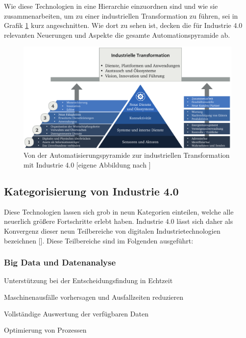 Wie diese Technologien in eine Hierarchie einzuordnen sind und wie sie zusammenarbeiten, um zu einer industriellen Transformation zu führen, sei in Grafik \ref{fig:Industrie40transformation} kurz angeschnitten. Wie dort zu sehen ist, decken die für Industrie 4.0 relevanten Neuerungen und Aspekte die gesamte Automationspyramide ab.
%
\begin{figure}[htbp]
	\centering\includegraphics[width=1.0\textwidth]{images/02/Industrie40transformation.pdf}
    \caption{Von der Automatisierungspyramide zur industriellen Transformation mit Industrie 4.0 [eigene Abbildung nach \cite{industrie40explained}]}
    \label{fig:Industrie40transformation}
\end{figure}

\subsection{Kategorisierung von Industrie 4.0}
\label{subsec:industrie40kategorien}

Diese Technologien lassen sich grob in neun Kategorien einteilen, welche alle neuerlich größere Fortschritte erlebt haben. Industrie 4.0 lässt sich daher als Konvergenz dieser neun Teilbereiche von digitalen Industrietechnologien bezeichnen [\cite{industrie40explained}]. Diese Teilbereiche sind im Folgenden ausgeführt:

\WarningsOff[paralist]
\subsubsection*{Big Data und Datenanalyse}
\begin{compactenum}[•]
    \item Unterstützung bei der Entscheidungsfindung in Echtzeit
    \item Maschinenausfälle vorhersagen und Ausfallzeiten reduzieren
    \item Vollständige Auswertung der verfügbaren Daten
    \item Optimierung von Prozessen
\end{compactenum}

